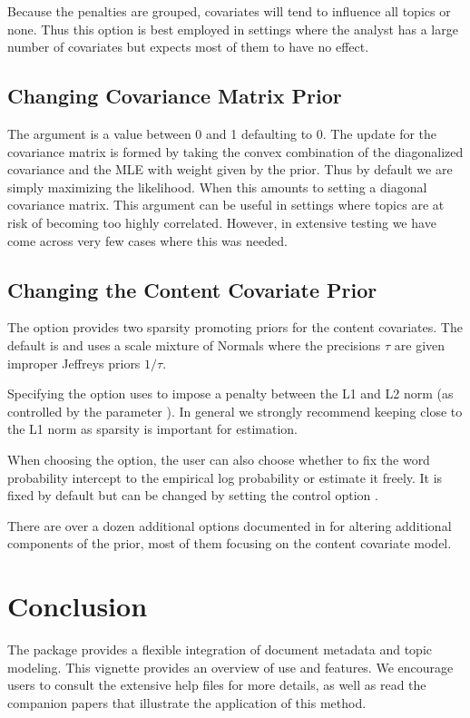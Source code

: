 \documentclass[nojss]{jss}
\begin{document}
Because the penalties are grouped, covariates will tend to influence all topics or none.  Thus this option is best employed in settings where the analyst has a large number of covariates but expects most of them to have no effect.

\subsection{Changing Covariance Matrix Prior}
The  argument is a value between 0 and 1 defaulting to 0.  The update for the covariance matrix is formed by taking the convex combination of the diagonalized covariance and the MLE with weight given by the prior.  Thus by default we are simply maximizing the likelihood.  When  this amounts to setting a diagonal covariance matrix.  This argument can be useful in settings where topics are at risk of becoming too highly correlated.  However, in extensive testing we have come across very few cases where this was needed.

\subsection{Changing the Content Covariate Prior}
The  option provides two sparsity promoting priors for the content covariates.  The default is  and uses a scale mixture of Normals where the precisions $\tau$ are given improper Jeffreys priors $1/\tau$.

Specifying the option  uses  to impose a penalty between the L1 and L2 norm (as controlled by the  parameter ).  In general we strongly recommend keeping close to the L1 norm as sparsity is important for estimation.

When choosing the  option, the user can also choose whether to fix the word probability intercept to the empirical log probability or estimate it freely.  It is fixed by default but can be changed by setting the control option .

There are over a dozen additional options documented in  for altering additional components of the prior, most of them focusing on the content covariate model.

\section{Conclusion}

The   package provides a flexible integration of document metadata and topic modeling. This vignette provides an overview of use and features. We encourage users to consult the extensive help files for more details, as well as read the companion papers that illustrate the application of this method.

\clearpage
{}

\end{document}
